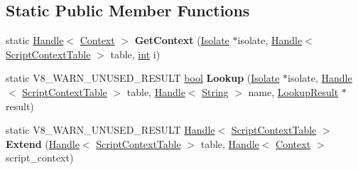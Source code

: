 \subsection*{Static Public Member Functions}
\begin{DoxyCompactItemize}
\item 
\mbox{\label{classv8_1_1internal_1_1ScriptContextTable_a6ab35b019a2645215e8ce542b26a6558}} 
static \mbox{\hyperlink{classv8_1_1internal_1_1Handle}{Handle}}$<$ \mbox{\hyperlink{classv8_1_1internal_1_1Context}{Context}} $>$ {\bfseries Get\+Context} (\mbox{\hyperlink{classv8_1_1internal_1_1Isolate}{Isolate}} $\ast$isolate, \mbox{\hyperlink{classv8_1_1internal_1_1Handle}{Handle}}$<$ \mbox{\hyperlink{classv8_1_1internal_1_1ScriptContextTable}{Script\+Context\+Table}} $>$ table, \mbox{\hyperlink{classint}{int}} i)
\item 
\mbox{\label{classv8_1_1internal_1_1ScriptContextTable_a916794df7437f6a5aa64a3b9419611e8}} 
static V8\+\_\+\+W\+A\+R\+N\+\_\+\+U\+N\+U\+S\+E\+D\+\_\+\+R\+E\+S\+U\+LT \mbox{\hyperlink{classbool}{bool}} {\bfseries Lookup} (\mbox{\hyperlink{classv8_1_1internal_1_1Isolate}{Isolate}} $\ast$isolate, \mbox{\hyperlink{classv8_1_1internal_1_1Handle}{Handle}}$<$ \mbox{\hyperlink{classv8_1_1internal_1_1ScriptContextTable}{Script\+Context\+Table}} $>$ table, \mbox{\hyperlink{classv8_1_1internal_1_1Handle}{Handle}}$<$ \mbox{\hyperlink{classv8_1_1internal_1_1String}{String}} $>$ name, \mbox{\hyperlink{structv8_1_1internal_1_1ScriptContextTable_1_1LookupResult}{Lookup\+Result}} $\ast$result)
\item 
\mbox{\label{classv8_1_1internal_1_1ScriptContextTable_a209aaa92e2a6ca9be52942c66ac6afab}} 
static V8\+\_\+\+W\+A\+R\+N\+\_\+\+U\+N\+U\+S\+E\+D\+\_\+\+R\+E\+S\+U\+LT \mbox{\hyperlink{classv8_1_1internal_1_1Handle}{Handle}}$<$ \mbox{\hyperlink{classv8_1_1internal_1_1ScriptContextTable}{Script\+Context\+Table}} $>$ {\bfseries Extend} (\mbox{\hyperlink{classv8_1_1internal_1_1Handle}{Handle}}$<$ \mbox{\hyperlink{classv8_1_1internal_1_1ScriptContextTable}{Script\+Context\+Table}} $>$ table, \mbox{\hyperlink{classv8_1_1internal_1_1Handle}{Handle}}$<$ \mbox{\hyperlink{classv8_1_1internal_1_1Context}{Context}} $>$ script\+\_\+context)
\end{DoxyCompactItemize}
